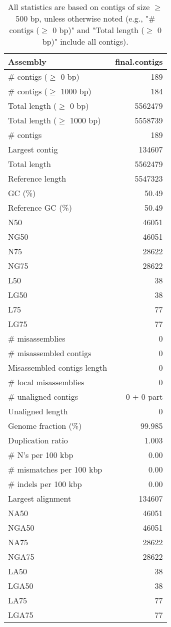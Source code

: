 \documentclass[12pt,a4paper]{article}
\begin{document}
\begin{table}[ht]
\begin{center}
\caption{All statistics are based on contigs of size $\geq$ 500 bp, unless otherwise noted (e.g., "\# contigs ($\geq$ 0 bp)" and "Total length ($\geq$ 0 bp)" include all contigs).}
\begin{tabular}{|l*{1}{|r}|}
\hline
Assembly & final.contigs \\ \hline
\# contigs ($\geq$ 0 bp) & 189 \\ \hline
\# contigs ($\geq$ 1000 bp) & 184 \\ \hline
Total length ($\geq$ 0 bp) & 5562479 \\ \hline
Total length ($\geq$ 1000 bp) & 5558739 \\ \hline
\# contigs & 189 \\ \hline
Largest contig & 134607 \\ \hline
Total length & 5562479 \\ \hline
Reference length & 5547323 \\ \hline
GC (\%) & 50.49 \\ \hline
Reference GC (\%) & 50.49 \\ \hline
N50 & 46051 \\ \hline
NG50 & 46051 \\ \hline
N75 & 28622 \\ \hline
NG75 & 28622 \\ \hline
L50 & 38 \\ \hline
LG50 & 38 \\ \hline
L75 & 77 \\ \hline
LG75 & 77 \\ \hline
\# misassemblies & 0 \\ \hline
\# misassembled contigs & 0 \\ \hline
Misassembled contigs length & 0 \\ \hline
\# local misassemblies & 0 \\ \hline
\# unaligned contigs & 0 + 0 part \\ \hline
Unaligned length & 0 \\ \hline
Genome fraction (\%) & 99.985 \\ \hline
Duplication ratio & 1.003 \\ \hline
\# N's per 100 kbp & 0.00 \\ \hline
\# mismatches per 100 kbp & 0.00 \\ \hline
\# indels per 100 kbp & 0.00 \\ \hline
Largest alignment & 134607 \\ \hline
NA50 & 46051 \\ \hline
NGA50 & 46051 \\ \hline
NA75 & 28622 \\ \hline
NGA75 & 28622 \\ \hline
LA50 & 38 \\ \hline
LGA50 & 38 \\ \hline
LA75 & 77 \\ \hline
LGA75 & 77 \\ \hline
\end{tabular}
\end{center}
\end{table}
\end{document}
